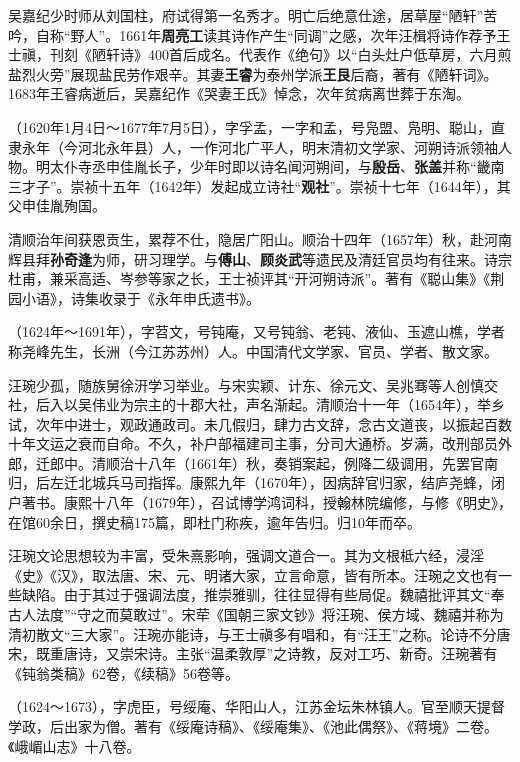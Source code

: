 \begin{description}
        吴嘉纪少时师从刘国柱，府试得第一名秀才。明亡后绝意仕途，居草屋“陋轩”苦吟，自称“野人”。1661年\textbf{周亮工}读其诗作产生“同调”之感，次年汪楫将诗作荐予王士禛，刊刻《陋轩诗》400首后成名。代表作《绝句》以“白头灶户低草房，六月煎盐烈火旁”展现盐民劳作艰辛。其妻\textbf{王睿}为泰州学派\textbf{王艮}后裔，著有《陋轩词》。1683年王睿病逝后，吴嘉纪作《哭妻王氏》悼念，次年贫病离世葬于东淘。
  \item[申涵光] （1620年1月4日～1677年7月5日），字孚孟，一字和孟，号凫盟、凫明、聪山，直隶永年（今河北永年县）人，一作河北广平人，明末清初文学家、河朔诗派领袖人物。明太仆寺丞申佳胤长子，少年时即以诗名闻河朔间，与\textbf{殷岳}、\textbf{张盖}并称“畿南三才子”。崇祯十五年（1642年）发起成立诗社“\textbf{观社}”。崇祯十七年（1644年），其父申佳胤殉国。\par
        清顺治年间获恩贡生，累荐不仕，隐居广阳山。顺治十四年（1657年）秋，赴河南辉县拜\textbf{孙奇逢}为师，研习理学。与\textbf{傅山}、\textbf{顾炎武}等遗民及清廷官员均有往来。诗宗杜甫，兼采高适、岑参等家之长，王士祯评其“开河朔诗派”。著有《聪山集》《荆园小语》，诗集收录于《永年申氏遗书》。
  \item[汪琬] （1624年～1691年），字苕文，号钝庵，又号钝翁、老钝、液仙、玉遮山樵，学者称尧峰先生，长洲（今江苏苏州）人。中国清代文学家、官员、学者、散文家。\par
        汪琬少孤，随族舅徐汧学习举业。与宋实颖、计东、徐元文、吴兆骞等人创慎交社，后入以吴伟业为宗主的十郡大社，声名渐起。清顺治十一年（1654年），举乡试，次年中进士，观政通政司。未几假归，肆力古文辞，念古文道丧，以振起百数十年文运之衰而自命。不久，补户部福建司主事，分司大通桥。岁满，改刑部员外郎，迁郎中。清顺治十八年（1661年）秋，奏销案起，例降二级调用，先罢官南归，后左迁北城兵马司指挥。康熙九年（1670年），因病辞官归家，结庐尧蜂，闭户著书。康熙十八年（1679年），召试博学鸿词科，授翰林院编修，与修《明史》，在馆60余日，撰史稿175篇，即杜门称疾，逾年告归。归10年而卒。\par
        汪琬文论思想较为丰富，受朱熹影响，强调文道合一。其为文根柢六经，浸淫《史》《汉》，取法唐、宋、元、明诸大家，立言命意，皆有所本。汪琬之文也有一些缺陷。由于其过于强调法度，推崇雅驯，往往显得有些局促。魏禧批评其文“奉古人法度”“守之而莫敢过”。宋荦《国朝三家文钞》将汪琬、侯方域、魏禧并称为清初散文“三大家”。汪琬亦能诗，与王士禛多有唱和，有“汪王”之称。论诗不分唐宋，既重唐诗，又崇宋诗。主张“温柔敦厚”之诗教，反对工巧、新奇。汪琬著有《钝翁类稿》62卷，《续稿》56卷等。
  \item[蒋超] （1624～1673），字虎臣，号绥庵、华阳山人，江苏金坛朱林镇人。官至顺天提督学政，后出家为僧。著有《绥庵诗稿》、《绥庵集》、《池此偶祭》、《蒋境》二卷。《峨嵋山志》十八卷。

\end{description}
